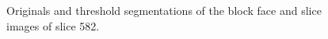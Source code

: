 \begin{figure}[htbp]
    \caption{Originals and threshold segmentations of the block face and slice images of slice 582.}
    \label{fig:582_segmentation}
  \end{figure}

